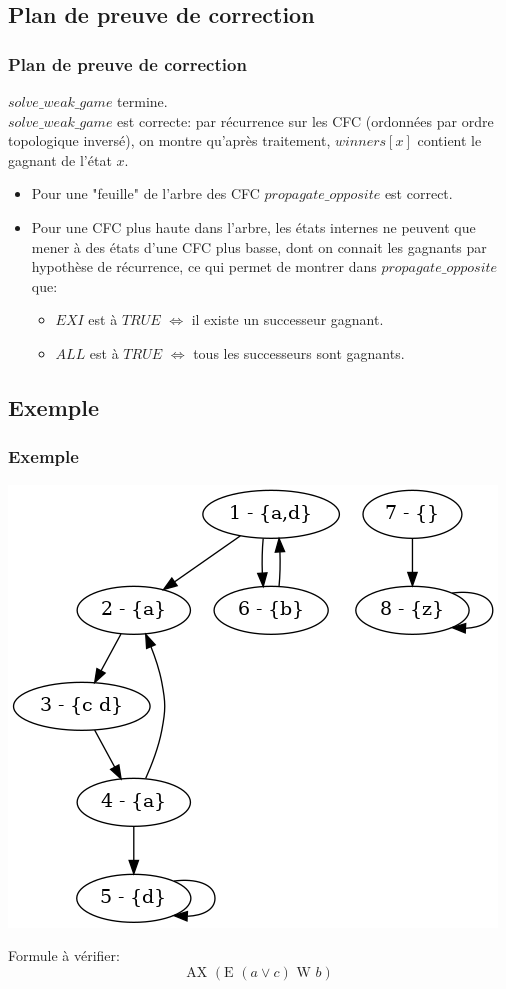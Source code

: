 \documentclass[11pt]{beamer}
\begin{document}
\subsection{Plan de preuve de correction}
\begin{frame}
	\frametitle{Plan de preuve de correction}
	$solve\_weak\_game$ termine. \\
	\bigskip \pause
	$solve\_weak\_game$ est correcte: par récurrence sur les CFC (ordonnées par ordre topologique inversé), on montre qu'après traitement, $winners[x]$ contient le gagnant de l'état $x$.
	\begin{itemize}
		\item Pour une "feuille" de l'arbre des CFC $propagate\_opposite$ est correct.
		\item Pour une CFC plus haute dans l'arbre, les états internes ne peuvent que mener à des états d'une CFC plus basse, dont on connait les gagnants par hypothèse de récurrence, ce qui permet de montrer dans $propagate\_opposite$ que:
		\begin{itemize}
			\item $EXI$ est à $TRUE$ $\iff$ il existe un successeur gagnant.
			\item $ALL$ est à $TRUE$ $\iff$ tous les successeurs sont gagnants.
		\end{itemize}
	\end{itemize}
\end{frame}

\subsection{Exemple}
\begin{frame}
	\frametitle{Exemple}
	\begin{center}
	\includegraphics[scale=0.35]{imgs/g2.png}
	\end{center}
Formule à vérifier:
	$$ \mbox{AX } (\mbox{E } (a \lor c) \mbox{ W } b) $$
\end{frame}
\end{document}

